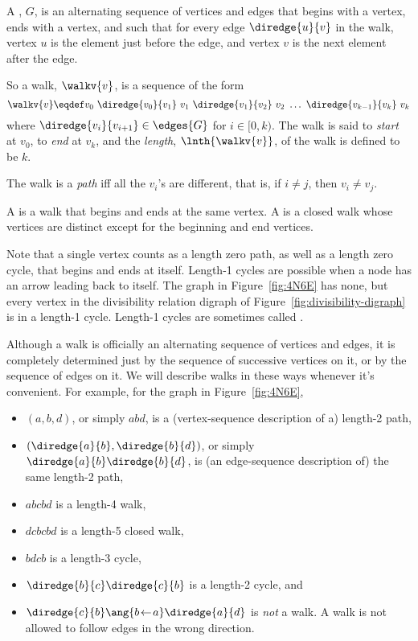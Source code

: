 \begin{definition}\label{def:digraph-walks}
A , $G$, is an alternating sequence of
vertices and edges that begins with a vertex, ends with a vertex, and
such that for every edge $\diredge{u}{v}$ in the walk, vertex $u$ is
the element just before the edge, and vertex $v$ is the next element
after the edge.

So a walk, $\walkv{v}$, is a sequence of the form
\[
\walkv{v} \eqdef v_0\ \diredge{v_0}{v_1}\
v_1\  \diredge{v_1}{v_2}\  v_2\  \dots\  \diredge{v_{k-1}}{v_k}\  v_k
\]
where $\diredge{v_i}{v_{i+1}} \in \edges{G}$ for $i \in [0,k)$.
  The walk is said to \emph{start} at $v_0$, to \emph{end} at $v_k$,
  and the \emph{length}, $\lnth{\walkv{v}}$, of the walk is defined to be
  $k$. 

 The walk is a \emph{path} iff all the $v_i$'s are different, that is,
 if $i \neq j$, then $v_i \neq v_j$.

A  is a walk that begins and ends at the same
vertex.  A  is a closed walk whose vertices are distinct
except for the beginning and end vertices.
\end{definition}
Note that a single vertex counts as a length zero path, as well as a
length zero cycle, that begins and ends at itself.  Length-1 cycles
are possible when a node has an arrow leading back to itself.  The
graph in Figure~\ref{fig:4N6E} has none, but every vertex in the
divisibility relation digraph of Figure~\ref{fig:divisibility-digraph}
is in a length-1 cycle.  Length-1 cycles are sometimes called
.

Although a walk is officially an alternating sequence of vertices and
edges, it is completely determined just by the sequence of successive
vertices on it, or by the sequence of edges on it.  We will
describe walks in these ways whenever it's convenient.  For example,
for the graph in Figure~\ref{fig:4N6E},
\begin{itemize}

\item $(a, b, d)$, or simply $abd$, is a (vertex-sequence description
  of a) length-2 path,

\item $(\diredge{a}{b}, \diredge{b}{d})$, or simply
  $\diredge{a}{b}\diredge{b}{d}$, is (an edge-sequence description of)
  the same length-2 path,

\item $abcbd$ is a length-4 walk,

\item $dcbcbd$ is a length-5 closed walk,

\item $bdcb$ is a length-3 cycle,

\item $\diredge{b}{c}\diredge{c}{b}$ is a length-2 cycle, and

\item $\diredge{c}{b}\ang{b\! \leftarrow\! a}\diredge{a}{d}$
  is \emph{not} a walk.  A walk is not allowed to follow
  edges in the wrong direction.
\end{itemize}


